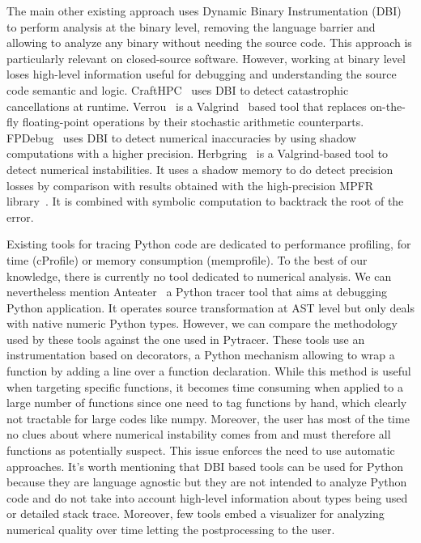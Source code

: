 \documentclass[11pt]{article}
\begin{document}
The main other existing approach uses Dynamic Binary Instrumentation (DBI) to perform analysis at the binary level,
removing the language barrier and allowing to analyze any binary without needing the source code. This approach
is particularly relevant on closed-source software. However, working at binary level loses high-level information useful
for debugging and understanding the source code semantic and logic.
CraftHPC~\cite{lam2013dynamic} uses DBI to detect catastrophic cancellations at runtime.
Verrou~\cite{fevotte2016verrou} is a Valgrind~\cite{nethercote2007valgrind} based tool that replaces on-the-fly
floating-point operations by their stochastic arithmetic counterparts. FPDebug~\cite{benz2012dynamic} uses DBI to detect numerical 
inaccuracies by using shadow computations with a higher precision.
Herbgring~\cite{sanchez2017finding} is a Valgrind-based tool to detect
numerical instabilities. It uses a shadow memory to do detect precision losses by comparison with results obtained with the high-precision 
MPFR library~\cite{fousse2007mpfr}. It is combined with symbolic computation to backtrack the root of the error.

Existing tools for tracing Python code are dedicated to performance profiling, for time (cProfile) 
or memory consumption (memprofile). 
To the best of our knowledge, there is currently no tool dedicated to numerical analysis.
We can nevertheless mention Anteater~\cite{faust2019anteater} a Python tracer tool that aims at debugging Python application. 
It operates source transformation at AST level but only deals with native numeric Python types.
However, we can compare the methodology used by these tools against the one used in Pytracer.
These tools use an instrumentation based on decorators, a Python mechanism allowing 
to wrap a function by adding a line over a function declaration.
While this method is useful when targeting specific functions, it becomes time consuming 
when applied to a large number of functions since one need to tag functions by hand,
which clearly not tractable for large codes like numpy. Moreover, the user has most of the time no clues
about where numerical instability comes from and must therefore all functions as potentially suspect. 
This issue enforces the need to use automatic approaches.
It's worth mentioning that DBI based tools can be used for Python because they are language agnostic but
they are not intended to analyze Python code and do not take into account high-level information about 
types being used or detailed stack trace. Moreover, few tools embed a visualizer for 
analyzing numerical quality over time letting the postprocessing to the user. 
\end{document}
